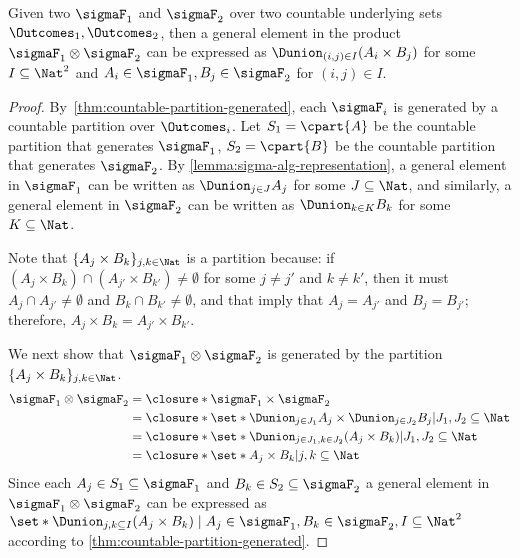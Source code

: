 \documentclass[acmsmall,nonacm,screen,appendix]{acmart}
\begin{document}
\begin{lemma}
 \label{lemma:product-algebra}
 Given two \salgebra[s] $\sigmaF_1$ and $\sigmaF_2$
 over two countable underlying sets $\Outcomes_1, \Outcomes_2$,
 then a general element in the product \salgebra{}
 $\sigmaF_1 \otimes \sigmaF_2$ can
 be expressed as $\Dunion_{(i, j) \in I} (A_{i} \times B_{j})$
 for some $I \subseteq \Nat^2$ and
 $A_{i} \in \sigmaF_{1}, B_{j} \in \sigmaF_{2}$ for $(i,j) \in I$.
\end{lemma}

 \begin{proof}
By~\cref{thm:countable-partition-generated}, each \salgebra{}
  $\sigmaF_i$ is generated by a countable partition over $\Outcomes_i$.
  Let $S_1 = \cpart{A}$ be the countable partition that generates $\sigmaF_1$,
  $S_2 = \cpart{B}$ be the countable partition that generates $\sigmaF_2$.
    By \cref{lemma:sigma-alg-representation},
    a general element in $\sigmaF_1$ can be written as
  $\Dunion_{j \in J} A_{j}$ for some $J \subseteq \Nat$,
  and similarly,
   a general element in $\sigmaF_2$ can be written as
  $\Dunion_{k \in K} B_{k}$ for some $K \subseteq \Nat$.

  Note that $\{A_j \times B_k \}_{j, k \in \Nat}$ is a partition because:
  if $(A_j \times B_k)  \cap (A_{j'} \times B_{k'}) \neq \emptyset$ for some
  $j \neq j'$ and $k \neq k'$,
  then it must $A_j \cap A_{j'} \neq \emptyset$ and $B_k \cap B_{k'} \neq \emptyset$,
  and that imply that $A_j =A_{j'}$ and $B_j =B_{j'}$;
  therefore, $A_j \times B_k = A_{j'} \times B_{k'}$.

  We next show that $\sigmaF_1 \otimes \sigmaF_2$ is generated by
  the partition $\{A_j \times B_k \}_{j, k \in \Nat}$.
\begin{align*}
   \sigmaF_1 \otimes \sigmaF_2
   &= \closure*{\sigmaF_1 \times \sigmaF_2} \\
   &= \closure*{\set*{\Dunion_{j \in J_1} A_{j} \times \Dunion_{j \in J_2} B_{j} | J_1, J_2 \subseteq \Nat}} \\
   &= \closure*{\set*{\Dunion_{j \in J_1, k \in J_2}  (A_{j} \times B_{k}) | J_1, J_2 \subseteq \Nat }} \\
   &= \closure*{\set*{ A_{j} \times B_{k} | j, k\subseteq \Nat }}
   \end{align*}
Since each $A_j \in S_1 \subseteq \sigmaF_1$ and $B_k \in S_2 \subseteq \sigmaF_2$
   a general element in $\sigmaF_1 \otimes \sigmaF_2$ can
  be expressed as $\set*{\Dunion_{j, k \subseteq I} (A_{j} \times B_{k}) \mid
  A_{j} \in \sigmaF_{1}, B_{k} \in \sigmaF_{2}, I \subseteq \Nat^2}$
according to \cref{thm:countable-partition-generated}.
 \end{proof}
\end{document}
